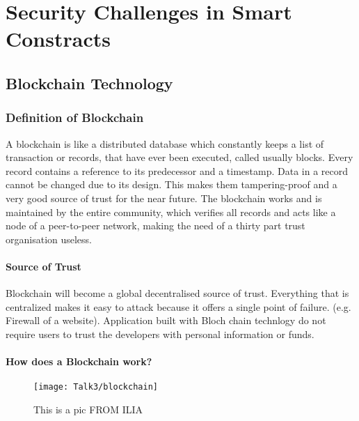 \chapter{Security Challenges in Smart Constracts}


\newpage

\minitoc %

\newpage


\section{Blockchain Technology}
\subsection{Definition of Blockchain}
A blockchain is like a distributed database which constantly keeps a list of transaction or records, that have ever been executed, called usually blocks. Every record contains a reference to its predecessor and a timestamp. \cite{wikipedia1}
Data in a record cannot be changed due to its design. This makes them tampering-proof and a very good source of trust for the near future. \cite{blockchain3}
The blockchain works and is maintained by the entire community, which verifies all records and acts like a node of a peer-to-peer network, making the need of a thirty part trust organisation useless. \cite{blockchain0}
\subsubsection{Source of Trust}
Blockchain will become a global decentralised source of trust.
Everything that is centralized makes it easy to attack because it offers a single point of failure. 
(e.g. Firewall of a website). 
Application built with Bloch chain technlogy do not require  users to trust the developers with personal information or funds. 
\subsubsection{How does a Blockchain work?}
           \begin{figure}[ht]
         \begin{center}
         \texttt{[image: Talk3/blockchain]}
         \end{center}
         \caption{This is a pic FROM ILIA}
         \label{label}
       \end{figure}
   
